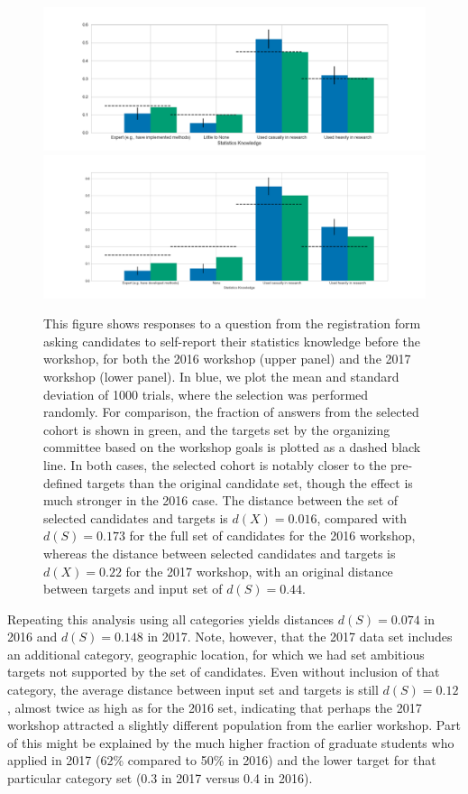 \documentclass[10pt,letterpaper]{article}
\begin{document}
\begin{figure}[h!]
\begin{center}
\includegraphics[width=15cm]{stats_results2016.png}
\includegraphics[width=15cm]{stats_results2017.png}
\caption{This figure shows responses to a question from the registration form asking candidates to self-report their statistics knowledge before the workshop, for both the 2016 workshop (upper panel) and the 2017 workshop (lower panel). In blue, we plot the mean and standard deviation of 1000 trials, where the selection was performed randomly.%
For comparison, the fraction of answers from the selected cohort is shown in green, and the targets set by the organizing committee based on the workshop goals is plotted as a dashed black line.
In both cases, the selected cohort is notably closer to the pre-defined targets than the original candidate set, though the effect is much stronger in the 2016 case.
The distance between the set of selected candidates and targets is $d(X)=0.016$, compared with $d(S)=0.173$ for the full set of candidates for the 2016 workshop, whereas the distance between selected candidates and targets is $d(X)=0.22$ for the 2017 workshop, with an original distance between targets and input set of $d(S)=0.44$.}
\label{fig:entrofy_stats}
\end{center}
\end{figure}

Repeating this analysis using all categories yields distances $d(S)=0.074$ in 2016 and $d(S)=0.148$ in 2017.
Note, however, that the 2017 data set includes an additional category, geographic location, for which we had set ambitious targets not supported by the set of candidates.
Even without inclusion of that category, the average distance between input set and targets is still $d(S)=0.12$, almost twice as high as for the 2016 set, indicating that perhaps the 2017 workshop attracted a slightly different population from the earlier workshop.
Part of this might be explained by the much higher fraction of graduate students who applied in 2017 (62\% compared to 50\% in 2016) and the lower target for that particular category set (0.3 in 2017 versus 0.4 in 2016).
    
\end{document}
